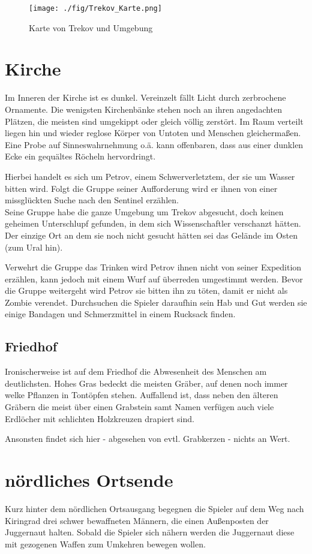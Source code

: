 \begin{figure}[ht]
	\begin{center}
		\texttt{[image: ./fig/Trekov\_Karte.png]}
		\caption{Karte von Trekov und Umgebung}
	\end{center}
\end{figure}

\section{Kirche}

Im Inneren der Kirche ist es dunkel. Vereinzelt fällt Licht durch zerbrochene Ornamente. Die wenigsten Kirchenbänke stehen noch an ihren angedachten Plätzen, die meisten sind umgekippt oder gleich völlig zerstört. Im Raum verteilt liegen hin und wieder reglose Körper von Untoten und Menschen gleichermaßen.
Eine Probe auf Sinneswahrnehmung o.ä. kann offenbaren, dass aus einer dunklen Ecke ein gequältes Röcheln hervordringt.

Hierbei handelt es sich um Petrov, einem Schwerverletztem, der sie um Wasser bitten wird. Folgt die Gruppe seiner Aufforderung wird er ihnen von einer missglückten Suche nach den Sentinel erzählen.
\\Seine Gruppe habe die ganze Umgebung um Trekov abgesucht, doch keinen geheimen Unterschlupf gefunden, in dem sich Wissenschaftler verschanzt hätten. Der einzige Ort an dem sie noch nicht gesucht hätten sei das Gelände im Osten (zum Ural hin).

Verwehrt die Gruppe das Trinken wird Petrov ihnen nicht von seiner Expedition erzählen, kann jedoch mit einem Wurf auf überreden umgestimmt werden. Bevor die Gruppe weitergeht wird Petrov sie bitten ihn zu töten, damit er nicht als Zombie verendet.
Durchsuchen die Spieler daraufhin sein Hab und Gut werden sie einige Bandagen und Schmerzmittel in einem Rucksack finden.

\subsection{Friedhof}
Ironischerweise ist auf dem Friedhof die Abwesenheit des Menschen am deutlichsten. Hohes Gras bedeckt die meisten Gräber, auf denen noch immer welke Pflanzen in Tontöpfen stehen. Auffallend ist, dass neben den älteren Gräbern die meist über einen Grabstein samt Namen verfügen auch viele Erdlöcher mit schlichten Holzkreuzen drapiert sind.

Ansonsten findet sich hier - abgesehen von evtl. Grabkerzen - nichts an Wert.

\section{nördliches Ortsende}

Kurz hinter dem nördlichen Ortsausgang begegnen die Spieler auf dem Weg nach Kiringrad drei schwer bewaffneten Männern, die einen Außenposten der Juggernaut halten.
Sobald die Spieler sich nähern werden die Juggernaut diese mit gezogenen Waffen zum Umkehren bewegen wollen.
